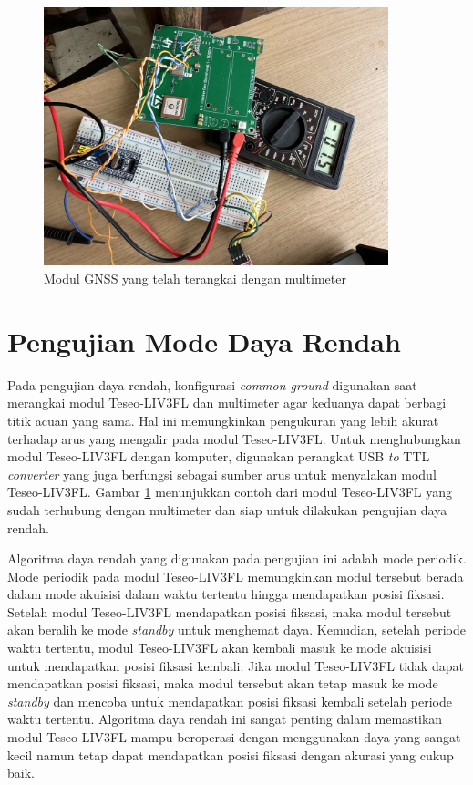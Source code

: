 \begin{figure}[H]
	\centering
	\includegraphics[width=10cm]{contents/chapter-4/low-power.jpg}
	\caption{Modul GNSS yang telah terangkai dengan multimeter}
	\label{Fig: low-power-connected}
\end{figure}

\section{Pengujian Mode Daya Rendah}
Pada pengujian daya rendah, konfigurasi \textit{common ground} digunakan saat merangkai modul Teseo\hyp{}LIV3FL dan multimeter agar keduanya dapat berbagi titik acuan yang sama. Hal ini memungkinkan pengukuran yang lebih akurat terhadap arus yang mengalir pada modul Teseo\hyp{}LIV3FL. Untuk menghubungkan modul Teseo\hyp{}LIV3FL dengan komputer, digunakan perangkat USB \textit{to} TTL \textit{converter} yang juga berfungsi sebagai sumber arus untuk menyalakan modul Teseo\hyp{}LIV3FL. Gambar \ref{Fig: low-power-connected} menunjukkan contoh dari modul Teseo\hyp{}LIV3FL yang sudah terhubung dengan multimeter dan siap untuk dilakukan pengujian daya rendah.

Algoritma daya rendah yang digunakan pada pengujian ini adalah mode periodik. Mode periodik pada modul Teseo\hyp{}LIV3FL memungkinkan modul tersebut berada dalam mode akuisisi dalam waktu tertentu hingga mendapatkan posisi fiksasi. Setelah modul Teseo\hyp{}LIV3FL mendapatkan posisi fiksasi, maka modul tersebut akan beralih ke mode \textit{standby} untuk menghemat daya. Kemudian, setelah periode waktu tertentu, modul Teseo\hyp{}LIV3FL akan kembali masuk ke mode akuisisi untuk mendapatkan posisi fiksasi kembali. Jika modul Teseo\hyp{}LIV3FL tidak dapat mendapatkan posisi fiksasi, maka modul tersebut akan tetap masuk ke mode \textit{standby} dan mencoba untuk mendapatkan posisi fiksasi kembali setelah periode waktu tertentu. Algoritma daya rendah ini sangat penting dalam memastikan modul Teseo\hyp{}LIV3FL mampu beroperasi dengan menggunakan daya yang sangat kecil namun tetap dapat mendapatkan posisi fiksasi dengan akurasi yang cukup baik.


